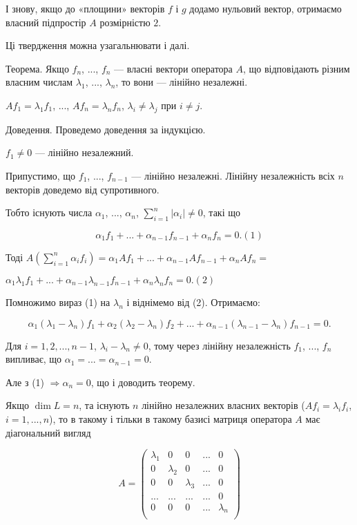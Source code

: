 І знову, якщо до «площини» векторів $f$ і $g$ додамо нульовий вектор,
отримаємо власний підпростір $A$ розмірністю $2$.

Ці твердження можна узагальнювати і далі.

Теорема. Якщо $f_n$, ..., $f_n$ --- власні вектори оператора $A$, що відповідають
різним власним числам $\lambda_1$, ..., $\lambda_n$, то вони --- лінійно незалежні.

$A f_1 = \lambda_1 f_1$, ..., $A f_n = \lambda_n f_n$, $\lambda_i \neq \lambda_j$ при $i \neq j$.

Доведення. Проведемо доведення за індукцією.

$f_1 \neq 0$ --- лінійно незалежний.

Припустимо, що $f_1$, ..., $f_{n-1}$ --- лінійно незалежні. Лінійну незалежність
всіх $n$ векторів доведемо від супротивного.

Тобто існують числа $\alpha_1$, ..., $\alpha_n$, $\sum\limits_{i=1}^n |\alpha_i| \neq 0$, такі що

$$\alpha_1 f_1 + ... + \alpha_{n-1} f_{n-1} + \alpha_n f_n = 0. (1)$$


Тоді $A\left( \sum\limits_{i=1}^n \alpha_i f_i \right) = \alpha_1 A f_1 + ...  + \alpha_{n-1} A f_{n-1} + \alpha_n A f_n =$

$\alpha_1 \lambda_1 f_1 + ... + \alpha_{n-1} \lambda_{n-1} f_{n-1} + \alpha_n \lambda_n f_n = 0. (2)$


Помножимо вираз (1) на $\lambda_n$ і віднімемо від (2). Отримаємо:

$$\alpha_1(\lambda_1 - \lambda_n)f_1 + \alpha_2(\lambda_2 - \lambda_n)f_2 + ... + \alpha_{n-1}(\lambda_{n-1} - \lambda_n)f_{n-1} = 0.$$


Для $i = 1,2,...,n -1$, $\lambda_i - \lambda_n \neq 0$, тому через лінійну незалежність
$f_1$, ..., $f_n$ випливає, що $\alpha_1 = ... = \alpha_{n-1} = 0$.

Але з (1) $\Rightarrow \alpha_n = 0$, що і доводить теорему.

Якщо $\dim L = n$, та існують $n$ лінійно незалежних власних векторів
($A f_i = \lambda_i f_i$, $i = 1, ..., n$), то в такому і тільки в такому базисі матриця оператора
$A$ має діагональний вигляд

$$A = \begin{pmatrix}
	\lambda_1 & 0 & 0 & ... & 0 \\
	0 & \lambda_2 & 0 & ... & 0 \\
	0 & 0 & \lambda_3 & ... & 0 \\
	... & ... & ... & ... & 0 \\
	0 & 0 & 0 & ... & \lambda_n \\
\end{pmatrix} $$

